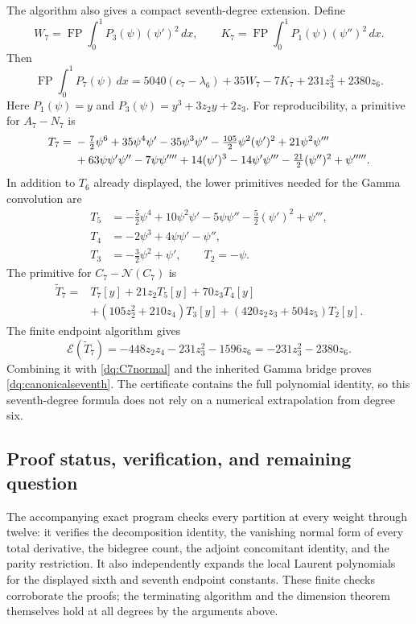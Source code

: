 \documentclass[11pt,a4paper]{article}
\numberwithin{equation}{section}
\theoremstyle{plain}
\theoremstyle{definition}
\theoremstyle{remark}
\begin{document}
The algorithm also gives a compact seventh-degree extension. Define
\[
 W_7=\operatorname{FP}\int_0^1P_3(\psi)(\psi')^2\,dx,
 \qquad
 K_7=\operatorname{FP}\int_0^1P_1(\psi)(\psi'')^2\,dx.
\]
Then
\begin{equation}\label{dq:canonicalseventh}
 \boxed{\displaystyle
 \operatorname{FP}\int_0^1P_7(\psi)\,dx
 =5040(c_7-\lambda_6)+35W_7-7K_7+231z_3^2+2380z_6.}
\end{equation}
Here $P_1(\psi)=y$ and $P_3(\psi)=y^3+3z_2y+2z_3$.
For reproducibility, a primitive for $A_7-N_7$ is
\begin{align}
 T_7={}&-\tfrac72\psi^6+35\psi^4\psi'-35\psi^3\psi''
        -\tfrac{105}2\psi^2(\psi')^2+21\psi^2\psi'''\notag\\
 &+63\psi\psi'\psi''-7\psi\psi''''+14(\psi')^3
        -14\psi'\psi'''-\tfrac{21}2(\psi'')^2+\psi'''''.
 \label{dq:T7}
\end{align}
In addition to $T_6$ already displayed, the lower primitives needed
for the Gamma convolution are
\begin{align*}
 T_5&=-\tfrac52\psi^4+10\psi^2\psi'-5\psi\psi''
                         -\tfrac52(\psi')^2+\psi''',\\
 T_4&=-2\psi^3+4\psi\psi'-\psi'',\\
 T_3&=-\tfrac32\psi^2+\psi',\qquad T_2=-\psi.
\end{align*}
The primitive for $C_7-\mathcal N(C_7)$ is
\begin{align*}
 \widetilde T_7={}&T_7[y]+21z_2T_5[y]+70z_3T_4[y]\\
  &+(105z_2^2+210z_4)T_3[y]+(420z_2z_3+504z_5)T_2[y].
\end{align*}
The finite endpoint algorithm gives
\[
 \mathcal E(\widetilde T_7)
 =-448z_2z_4-231z_3^2-1596z_6
 =-231z_3^2-2380z_6.
\]
Combining it with \eqref{dq:C7normal} and the inherited Gamma
bridge proves \eqref{dq:canonicalseventh}. The certificate contains
the full polynomial identity, so this seventh-degree formula does
not rely on a numerical extrapolation from degree six.

\subsection{Proof status, verification, and remaining question}

The accompanying exact program checks every partition at every weight
through twelve: it verifies the decomposition identity, the vanishing
normal form of every total derivative, the bidegree count, the adjoint
concomitant identity, and the parity restriction. It also independently
expands the local Laurent polynomials for the displayed sixth and
seventh endpoint constants. These finite checks corroborate the
proofs; the terminating algorithm and the dimension theorem themselves
hold at all degrees by the arguments above.
\end{document}
